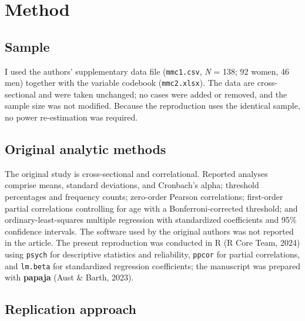 \documentclass[
  english,
  man,floatsintext]{apa6}
\begin{document}
\section{Method}\label{method}

\subsection{Sample}\label{sample}

I used the authors' supplementary data file (\texttt{mmc1.csv}, \emph{N} = 138; 92 women, 46 men) together with the variable codebook (\texttt{mmc2.xlsx}). The data are cross-sectional and were taken unchanged; no cases were added or removed, and the sample size was not modified. Because the reproduction uses the identical sample, no power re-estimation was required.

\subsection{Original analytic methods}\label{original-analytic-methods}

The original study is cross-sectional and correlational. Reported analyses comprise means, standard deviations, and Cronbach's alpha; threshold percentages and frequency counts; zero-order Pearson correlations; first-order partial correlations controlling for age with a Bonferroni-corrected threshold; and ordinary-least-squares multiple regression with standardized coefficients and 95\% confidence intervals. The software used by the original authors was not reported in the article. The present reproduction was conducted in R (R Core Team, 2024) using \texttt{psych} for descriptive statistics and reliability, \texttt{ppcor} for partial correlations, and \texttt{lm.beta} for standardized regression coefficients; the manuscript was prepared with \textbf{papaja} (Aust \& Barth, 2023).

\subsection{Replication approach}\label{replication-approach}
\end{document}
